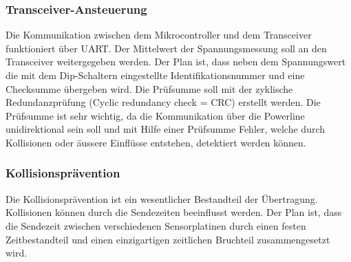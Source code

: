 \subsubsection{Transceiver-Ansteuerung}
Die Kommunikation zwischen dem Mikrocontroller und dem Transceiver funktioniert über UART. 
Der Mittelwert der Spannungsmessung soll an den Transceiver weitergegeben werden. Der Plan ist, dass neben dem Spannungswert die mit dem Dip-Schaltern eingestellte Identifikationsnummer und eine Checksumme übergeben wird. Die Prüfsumme soll mit der zyklische Redundanzprüfung (Cyclic redundancy check = CRC)  erstellt werden. Die Prüfsumme ist sehr wichtig, da die Kommunikation über die Powerline unidirektional sein soll und  mit Hilfe einer Prüfsumme Fehler, welche durch Kollisionen oder äussere Einflüsse entstehen, detektiert werden können.

\subsubsection{Kollisionsprävention}
Die Kollisionsprävention ist ein wesentlicher Bestandteil der Übertragung. Kollisionen können durch die Sendezeiten beeinflusst werden. Der Plan ist, dass die Sendezeit zwischen verschiedenen Sensorplatinen durch einen festen Zeitbestandteil und einen einzigartigen zeitlichen Bruchteil zusammengesetzt wird.















